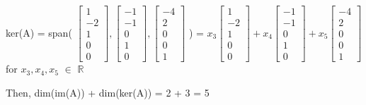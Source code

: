 \begin{tbox}
        \hspace{0.5cm}
        ker(A) = span(
        \scriptsize
        $\begin{bmatrix}
            1 \\
            -2 \\
            1 \\
            0 \\
            0
        \end{bmatrix},
        \begin{bmatrix}
            -1 \\
            -1 \\
            0 \\
            1 \\
            0
        \end{bmatrix},
        \begin{bmatrix}
            -4 \\
            2 \\
            0 \\
            0 \\
            1
        \end{bmatrix}$
        \normalsize) =
        \scriptsize
        $x_3\begin{bmatrix}
            1 \\
            -2 \\
            1 \\
            0 \\
            0
        \end{bmatrix} +
        x_4\begin{bmatrix}
            -1 \\
            -1 \\
            0 \\
            1 \\
            0
        \end{bmatrix}  +
        x_5\begin{bmatrix}
            -4 \\
            2 \\
            0 \\
            0 \\
            1
        \end{bmatrix}$
        \normalsize
        for $x_3,x_4,x_5$ $\in$ $\mathbb{R}$

        Then, dim(im(A)) + dim(ker(A))
        = 2 + 3 = 5
    \end{tbox}

